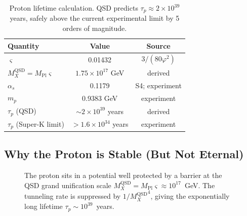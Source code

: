 \documentclass[11pt,a4paper]{article}
\theoremstyle{definition}
\theoremstyle{remark}
\newcommand{\strain}{\varsigma}
\newcommand{\gr}{\varphi}
\newcommand{\Mpl}{M_{\mathrm{Pl}}}
\newcommand{\MX}{{M_X^{\mathrm{QSD}}}}
\begin{document}
\begin{table}[H]
\centering
\begin{tabular}{lcc}
\toprule
\textbf{Quantity} & \textbf{Value} & \textbf{Source} \\
\midrule
$\strain$ & 0.01432 & $3/(80\gr^2)$ \\
$\MX = \Mpl\strain$ & $1.75 \times 10^{17}$ GeV & derived \\
$\alpha_s$ & 0.1179 & S4; experiment \\
$m_p$ & 0.9383 GeV & experiment \\
$\tau_p$ (QSD) & $\sim 2 \times 10^{39}$ years & derived \\
$\tau_p$ (Super-K limit) & $> 1.6 \times 10^{34}$ years & experiment \cite{SuperK2020} \\
\bottomrule
\end{tabular}
\caption{Proton lifetime calculation. QSD predicts $\tau_p \approx 2 \times 10^{39}$ years, safely above the current experimental limit by 5 orders of magnitude.}
\label{tab:proton}
\end{table}

\subsection{Why the Proton is Stable (But Not Eternal)}

\begin{figure}[H]
\centering
{}
\caption{The proton sits in a potential well protected by a barrier at the QSD grand unification scale $\MX = \Mpl\strain \approx 10^{17}$~GeV. The tunneling rate is suppressed by $1/\MX^4$, giving the exponentially long lifetime $\tau_p \sim 10^{39}$~years.}
\label{fig:barrier}
\end{figure}
\end{document}

